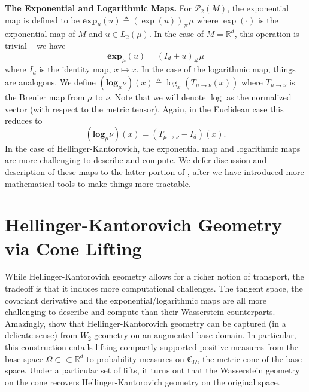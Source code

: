 \documentclass[11pt]{article}
\newcommand{\man}{M}
\begin{document}
\noindent \textbf{The Exponential and Logarithmic Maps.} For $\mathcal{P}_{2}(\man)$, the exponential map is defined to be $\mathbf{exp}_{\mu}(u) \triangleq (\exp(u))_\#\mu$ where $\exp(\cdot)$ is the exponential map of $\man$ and $u \in L_2(\mu)$. In the case of $\man = \mathbb{R}^d$, this operation is trivial -- we have
\begin{equation}\label{eq: wasserstein euclidean expmap}
    \mathbf{exp}_\mu(u) = (I_d + u)_\# \mu
\end{equation}
where $I_d$ is the identity map, $x \mapsto x$. In the case of the logarithmic map, things are analogous. We define $(\mathbf{log}_\mu\nu) (x) \triangleq \log_x(T_{\mu \rightarrow \nu}(x))$ where $T_{\mu \rightarrow \nu}$ is the Brenier map from $\mu$ to $\nu$. Note that we will denote $\overline{\log}$ as the normalized vector (with respect to the metric tensor). Again, in the Euclidean case this reduces to
\begin{equation}\label{eq: wasserstein euclidean logmap}
    (\mathbf{log}_\mu\nu )(x) = (T_{\mu \rightarrow \nu} - I_d)(x).
\end{equation}
In the case of Hellinger-Kantorovich, the exponential map and logarithmic maps are more challenging to describe and compute. We defer discussion and description of these maps to the latter portion of , after we have introduced more mathematical tools to make things more tractable.

\section{Hellinger-Kantorovich Geometry via Cone Lifting} \label{sec: HK geometry via cone}

While Hellinger-Kantorovich geometry allows for a richer notion of transport, the tradeoff is that it induces more computational challenges. The tangent space, the covariant derivative and the exponential/logarithmic maps are all more challenging to describe and compute than their Wasserstein counterparts. Amazingly, \citet{liero2016optimal} show that Hellinger-Kantorovich geometry can be captured (in a delicate sense) from $W_2$ geometry on an augmented base domain. In particular, this construction entails lifting compactly supported positive measures from the base space $\Omega \subset \subset \mathbb{R}^d$ to probability measures on $\mathfrak{C}_{\Omega}$, the metric cone of the base space. Under a particular set of lifts, it turns out that the Wasserstein geometry on the cone recovers Hellinger-Kantorovich geometry on the original space.
\end{document}
